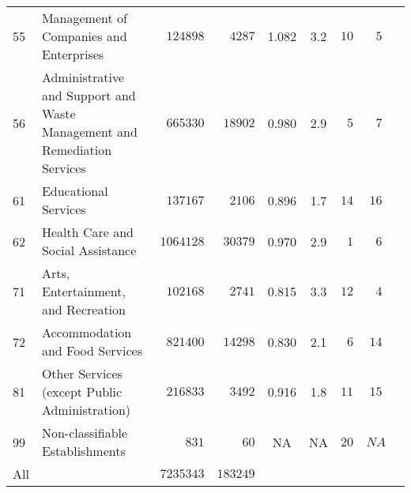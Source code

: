 \documentclass[9pt, oneside]{article}   	%
\begin{document}
\begin{longtable}{lp{3 in}ccccccc}
55  & Management of Companies and Enterprises & $\phantom{0}124898$ & $\phantom{00}4287$ & 1.082 & 3.2 & $10$ & $\phantom{0}5$ \\
56  & Administrative and Support and Waste Management and Remediation Services & $\phantom{0}665330$ & $\phantom{0}18902$ & 0.980 & 2.9 & $\phantom{0}5$ & $\phantom{0}7$ \\
61  & Educational Services & $\phantom{0}137167$ & $\phantom{00}2106$ & 0.896 & 1.7 & $14$ & $16$ \\
62  & Health Care and Social Assistance & $1064128$ & $\phantom{0}30379$ & 0.970 & 2.9 & $\phantom{0}1$ & $\phantom{0}6$ \\
71  & Arts, Entertainment, and Recreation & $\phantom{0}102168$ & $\phantom{00}2741$ & 0.815 & 3.3 & $12$ & $\phantom{0}4$ \\
72  & Accommodation and Food Services & $\phantom{0}821400$ & $\phantom{0}14298$ & 0.830 & 2.1 & $\phantom{0}6$ & $14$ \\
81  & Other Services (except Public Administration) & $\phantom{0}216833$ & $\phantom{00}3492$ & 0.916 & 1.8 & $11$ & $15$ \\
99  & Non-classifiable Establishments & $\phantom{0000}831$ & $\phantom{0000}60$ &    NA &  NA & $20$ & $NA$ \\
\cline{1-1} \cline{2-2} \cline{3-3} \cline{4-4} \cline{5-5} \cline{6-6} \cline{7-7} \cline{8-8} %
All  &  & $7235343$ & $183249$ &  &  &  &  \\
\hline 
\end{longtable}



\pagebreak
\end{document}
